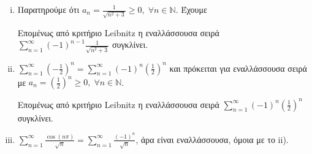 \documentclass[a4paper,table]{report}
\begin{document}
\begin{enumerate}
\begin{enumerate}[i)]
      \item Παρατηρούμε ότι $ a_{n}= \frac{1}{\sqrt{n^{2}+3}} \geq 0, 
        \; \forall n \in \mathbb{N}$. Έχουμε
        Επομένως από κριτήριο Leibnitz η εναλλάσσουσα σειρά $ \sum_{n=1}^{\infty} 
        (-1)^{n-1} \frac{1}{\sqrt{n^{2}+3}}$ συγκλίνει.

      \item $ \sum_{n=1}^{\infty} \left(- \frac{1}{2}\right)^{n} = 
        \sum_{n=1}^{\infty} (-1)^{n} 
        \left(\frac{1}{2}\right)^{n} $ και πρόκειται για εναλλάσσουσα σειρά με 
        $ a_{n}= \left(\frac{1}{2}\right)^{n} \geq 0, \; \forall n \in \mathbb{N} $.
        Επομένως από κριτήριο Leibnitz η εναλλάσσουσα σειρά $ \sum_{n=1}^{\infty} 
        (-1)^{n}\left(\frac{1}{2}\right)^{n} $ συγκλίνει.

      \item $ \sum_{n=1}^{\infty} \frac{\cos{(n \pi)}}{\sqrt{n}} = \sum_{n=1}^{\infty}
        \frac{(-1)^{n}}{\sqrt{n}}$, άρα είναι εναλλάσσουσα, όμοια με το ii).
    \end{enumerate}


\end{enumerate}
\end{document}
